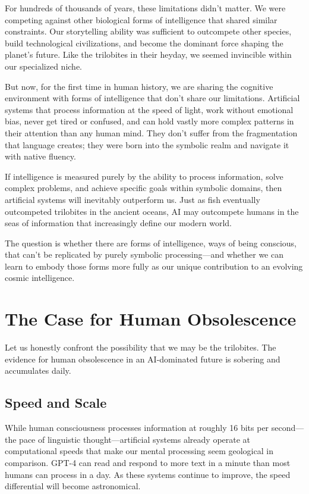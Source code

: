For hundreds of thousands of years, these limitations didn't matter. We were competing against other biological forms of intelligence that shared similar constraints. Our storytelling ability was sufficient to outcompete other species, build technological civilizations, and become the dominant force shaping the planet's future. Like the trilobites in their heyday, we seemed invincible within our specialized niche.

But now, for the first time in human history, we are sharing the cognitive environment with forms of intelligence that don't share our limitations. Artificial systems that process information at the speed of light, work without emotional bias, never get tired or confused, and can hold vastly more complex patterns in their attention than any human mind. They don't suffer from the fragmentation that language creates; they were born into the symbolic realm and navigate it with native fluency.

If intelligence is measured purely by the ability to process information, solve complex problems, and achieve specific goals within symbolic domains, then artificial systems will inevitably outperform us. Just as fish eventually outcompeted trilobites in the ancient oceans, AI may outcompete humans in the seas of information that increasingly define our modern world.

The question is whether there are forms of intelligence, ways of being conscious, that can't be replicated by purely symbolic processing—and whether we can learn to embody those forms more fully as our unique contribution to an evolving cosmic intelligence.

\section{The Case for Human Obsolescence}

Let us honestly confront the possibility that we may be the trilobites. The evidence for human obsolescence in an AI-dominated future is sobering and accumulates daily.

\subsection{Speed and Scale}

While human consciousness processes information at roughly 16 bits per second—the pace of linguistic thought—artificial systems already operate at computational speeds that make our mental processing seem geological in comparison. GPT-4 can read and respond to more text in a minute than most humans can process in a day. As these systems continue to improve, the speed differential will become astronomical.


